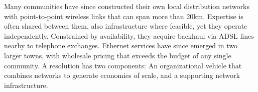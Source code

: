 

Many communities have since constructed their own local distribution networks
with point-to-point wireless links that can span more than 20km. Expertise is
often shared between them, also infrastructure where feasible, yet they operate
independently. Constrained by availability, they acquire backhaul via ADSL lines
nearby to telephone exchanges. Ethernet services have since emerged in two
larger towns, with wholesale pricing that exceeds the budget of any single
community. A resolution has two components: An organizational vehicle that
combines networks to generate economies of scale, and a supporting network
infrastructure.


